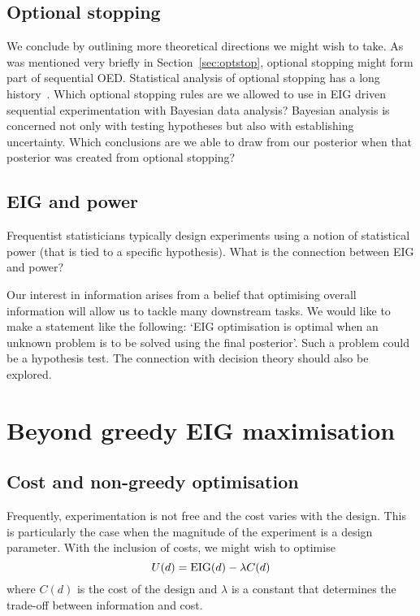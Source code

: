 \subsection{Optional stopping}
We conclude by outlining more theoretical directions we might wish to take. As was mentioned very briefly in Section~\ref{sec:optstop}, optional stopping might form part of sequential OED. Statistical analysis of optional stopping has a long history~\cite{chernoff1972sequential}. Which optional stopping rules are we allowed to use in EIG driven sequential experimentation with Bayesian data analysis? Bayesian analysis is concerned not only with testing hypotheses but also with establishing uncertainty. Which conclusions are we able to draw from our posterior when that posterior was created from optional stopping?


\subsection{EIG and power}
Frequentist statisticians typically design experiments using a notion of statistical power (that is tied to a specific hypothesis). What is the connection between EIG and power?

Our interest in information arises from a belief that optimising overall information will allow us to tackle many downstream tasks. We would like to make a statement like the following: `EIG optimisation is optimal when an unknown problem is to be solved using the final posterior'. Such a problem could be a hypothesis test. The connection with decision theory should also be explored.


\section{Beyond greedy EIG maximisation}
\subsection{Cost and non-greedy optimisation}
Frequently, experimentation is not free and the cost varies with the design. This is particularly the case when the magnitude of the experiment is a design parameter. With the inclusion of costs, we might wish to optimise
\begin{equation}
	U(d) = \text{EIG}(d) - \lambda C(d)
\end{equation}
where $C(d)$ is the cost of the design and $\lambda$ is a constant that determines the trade-off between information and cost.

